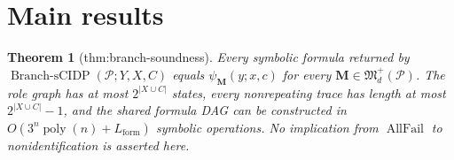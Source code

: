 \documentclass{article}
\newtheorem{theorem}{Theorem}
\begin{document}
\section{Main results}

\begin{theorem}[thm:branch-soundness]\label{thm:branch-soundness}
Every symbolic formula returned by \(\operatorname{Branch\text{-}sCIDP}(\mathcal P;Y,X,C)\) equals \(\psi_{\mathbf M}(y;x,c)\) for every \(\mathbf M\in\mathfrak M_d^+(\mathcal P)\). The role graph has at most \(2^{|X\cup C|}\) states, every nonrepeating trace has length at most \(2^{|X\cup C|}-1\), and the shared formula DAG can be constructed in \(O(3^n\operatorname{poly}(n)+L_{\mathrm{form}})\) symbolic operations. No implication from \(\operatorname{AllFail}\) to nonidentification is asserted here.
\end{theorem}
\end{document}
